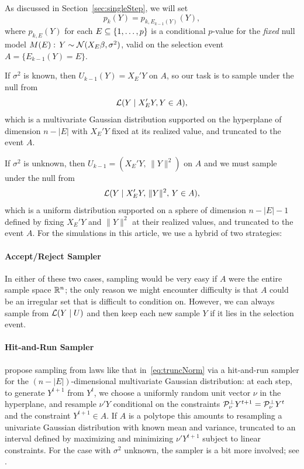 \documentclass{article}
\begin{document}
\begin{appendix}
As discussed in Section~\ref{sec:singleStep}, we will set
\[
p_k(Y) = p_{k, E_{k-1}(Y)}(Y),
\]
where $p_{k,E}(Y)$ for each $E\subseteq \{1,\ldots, p\}$ is a conditional $p$-value for the {\em fixed} null model $M(E):\, Y \sim \mathcal{N}(X_E\beta, \sigma^2)$, valid on the selection event $A=\{E_{k-1}(Y)=E\}$.

If $\sigma^2$ is known, then $U_{k-1}(Y) = X_{E}'Y$ on $A$, so our task is to sample under the null from
\begin{equation}\label{eq:truncNorm}
\mathcal{L}(Y \mid X_E'Y, Y\in A),
\end{equation}
which is a multivariate Gaussian distribution supported on the hyperplane of dimension $n-|E|$ with $X_E'Y$ fixed at its realized value, and truncated to the event $A$. 

If $\sigma^2$ is unknown, then $U_{k-1}=(X_E'Y,\, \|Y\|^2)$ on $A$ and we must sample under the null from
\begin{equation}\label{eq:truncUnif}
\mathcal{L}(Y \mid X_E'Y,\, \|Y\|^2,\, Y\in A),
\end{equation}
which is a uniform distribution supported on a sphere of dimension $n-|E|-1$ defined by fixing $X_E'Y$ and $\|Y\|^2$ at their realized values, and truncated to the event $A$. For the simulations in this article, we use a hybrid of two strategies:

\paragraph{Accept/Reject Sampler} In either of these two cases, sampling would be very easy if $A$ were the entire sample space $\mathbb{R}^n$; the only reason we might encounter difficulty is that $A$ could be an irregular set that is difficult to condition on. However, we can always sample from $\mathcal{L}(Y \mid U)$ and then keep each new sample $Y$ if it lies in the selection event.

\paragraph{Hit-and-Run Sampler} \citet{fithian2014optimal} propose sampling from laws like that in~\eqref{eq:truncNorm} via a hit-and-run sampler for the $(n-|E|)$-dimensional multivariate Gaussian distribution: at each step, to generate $Y^{t+1}$ from $Y^t$, we choose a uniformly random unit vector $\nu$ in the hyperplane, and resample $\nu'Y$ conditional on the constraints $\mathcal{P}_{\nu}^\perp Y^{t+1}=\mathcal{P}_{\nu}^\perp Y^t$ and the constraint $Y^{t+1}\in A$. If $A$ is a polytope this amounts to resampling a univariate Gaussian distribution with known mean and variance, truncated to an interval defined by maximizing and minimizing $\nu'Y^{t+1}$ subject to linear constraints. For the case with $\sigma^2$ unknown, the sampler is a bit more involved; see \citet{fithian2014optimal}.


\end{appendix}
\end{document}
